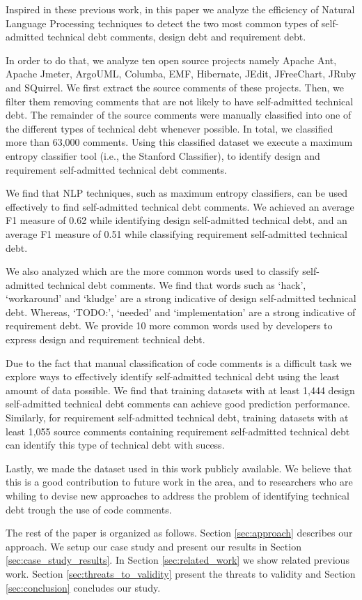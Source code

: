 \documentclass{sig-alternate}
\newcommand{\SATD}{self-admitted technical debt\xspace}
\begin{document}
Inspired in these previous work, in this paper we analyze the efficiency of Natural Language Processing techniques to detect the two most common types of \SATD comments, design debt and requirement debt. 

In order to do that, we analyze ten open source projects namely Apache Ant, Apache Jmeter, ArgoUML, Columba, EMF, Hibernate, JEdit, JFreeChart, JRuby and SQuirrel. We first extract the source comments of these projects. Then, we filter them removing comments that are not likely to have \SATD. The remainder of the source comments were manually classified into one of the different types of technical debt whenever possible. In total, we classified more than 63,000 comments. Using this classified dataset we execute a maximum entropy classifier tool (i.e., the Stanford Classifier), to identify design and requirement \SATD comments.

We find that NLP techniques, such as maximum entropy classifiers, can be used effectively to find \SATD comments. We achieved an average F1 measure of 0.62 while identifying design \SATD, and an average F1 measure of 0.51 while classifying requirement \SATD. 

We also analyzed which are the more common words used to classify \SATD comments. We find that words such as `hack', `workaround' and `kludge' are a strong indicative of design \SATD. Whereas, `TODO:', `needed' and `implementation' are a strong indicative of requirement debt. We provide 10 more common words used by developers to express design and requirement technical debt.  

Due to the fact that manual classification of code comments is a difficult task we explore ways to effectively identify \SATD using the least amount of data possible. We find that training datasets with at least 1,444 design \SATD comments can achieve good prediction performance. Similarly, for requirement \SATD, training datasets with at least 1,055 source comments containing requirement \SATD can identify this type of technical debt with sucess.  

Lastly, we made the dataset used in this work publicly available. We believe that this is a good contribution to future work in the area, and to researchers who are whiling to devise new approaches to address the problem of identifying technical debt trough the use of code comments.

The rest of the paper is organized as follows. Section \ref{sec:approach} describes our approach. We setup our case study and present our
results in Section \ref{sec:case_study_results}. In Section \ref{sec:related_work} we show related previous work. Section \ref{sec:threats_to_validity} present the threats to validity and Section \ref{sec:conclusion} concludes our study.  
\end{document}
